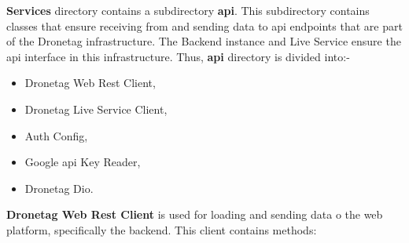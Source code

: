 \textbf{Services} directory contains a subdirectory \textbf{api}.
This subdirectory contains classes that ensure receiving from and sending data to \acrshort{api} endpoints that are part of the Dronetag infrastructure.
The Backend instance and Live Service ensure the \acrshort{api} interface in this infrastructure.
Thus, \textbf{api} directory is divided into:-
\begin{itemize}
    \item Dronetag Web Rest Client,
    \item Dronetag Live Service Client,
    \item Auth Config,
    \item Google \acrshort{api} Key Reader,
    \item Dronetag Dio.
\end{itemize}
\newpage
\textbf{Dronetag Web Rest Client} is used for loading and sending data o the web platform, specifically the backend.
This client contains methods:
